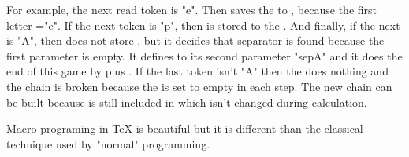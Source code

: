 For example, the next read token \tmp is "e". Then 
saves the  to \seplistLx, because the first letter
\tmp="e". If the next token \tmp is "p", then  is stored
to the \seplistLx. And finally, if the next \tmp is "A", then
 does not store , but it decides that
separator is found because the first parameter is empty. It defines \sepused
to its second parameter "sepA" and it does the end of this game by \seplistQ
plus \seplistZ. If the last token \tmp isn't "A" then the 
does nothing and the chain is broken because the \seplistLx is set to empty
in each step. The new chain can be built because  is
still included in \seplistL which isn't changed during calculation.

Macro-programing in TeX is beautiful but it is different than the classical
technique used by "normal" programming.
